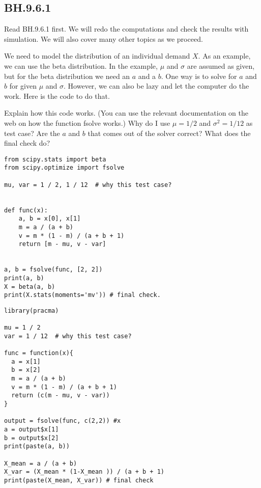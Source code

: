 
\subsection{BH.9.6.1}
\label{sec:bh.9.6.1}

Read BH.9.6.1 first. We will redo the computations and check the results with simulation. We will also cover many other topics as we proceed.



\begin{exercise}
We need to model the distribution of an individual demand $X$.
As an example, we can use the beta distribution.
In the example, $\mu$ and $\sigma$ are assumed as given, but for the beta distribution we need an $a$ and a $b$.
One way is to solve  for $a$ and $b$ for given $\mu$ and $\sigma$.
However, we can also be lazy and let the computer do the work.
Here is the code to do that.

Explain how this code works. (You can use the relevant documentation on the web on how the function fsolve works.) Why do I use $\mu=1/2$ and $\sigma^{2}=1/12$ as test case? Are the $a$ and $b$ that comes out of the solver correct? What does the final check do?
\begin{verbatim}
from scipy.stats import beta
from scipy.optimize import fsolve

mu, var = 1 / 2, 1 / 12  # why this test case?


def func(x):
    a, b = x[0], x[1]
    m = a / (a + b)
    v = m * (1 - m) / (a + b + 1)
    return [m - mu, v - var]


a, b = fsolve(func, [2, 2])
print(a, b)
X = beta(a, b)
print(X.stats(moments='mv')) # final check.
\end{verbatim}

\begin{verbatim}
library(pracma)

mu = 1 / 2
var = 1 / 12  # why this test case?

func = function(x){
  a = x[1]
  b = x[2]
  m = a / (a + b)
  v = m * (1 - m) / (a + b + 1)
  return (c(m - mu, v - var))
}

output = fsolve(func, c(2,2)) #x
a = output$x[1]
b = output$x[2]
print(paste(a, b))

X_mean = a / (a + b)
X_var = (X_mean * (1-X_mean )) / (a + b + 1)
print(paste(X_mean, X_var)) # final check

\end{verbatim}

\end{exercise}

